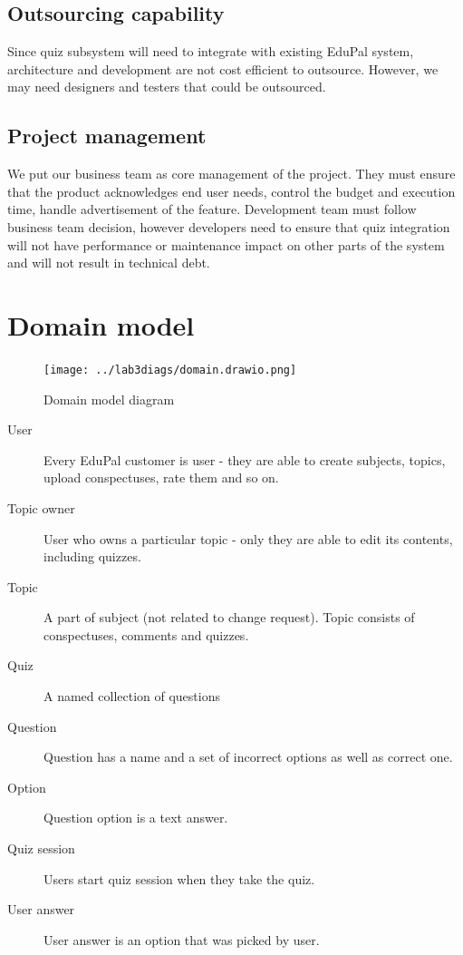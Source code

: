 \documentclass[
    english, %
]{VUMIFPSkursinis}
\begin{document}
\subsection{Outsourcing capability}

Since quiz subsystem will need to integrate with existing EduPal system, architecture and development are not cost efficient to outsource. However, we may need designers and testers that could be outsourced.

\subsection{Project management}

We put our business team as core management of the project. They must ensure that the product acknowledges end user needs, control the budget and execution time, handle advertisement of the feature. Development team must follow business team decision, however developers need to ensure that quiz integration will not have performance or maintenance impact on other parts of the system and will not result in technical debt.

\section{Domain model}

\begin{figure}[ht]
    \centering
    \texttt{[image: ../lab3diags/domain.drawio.png]}
    \caption{Domain model diagram}
    \label{domain-model}
\end{figure}

\begin{description}
    \item[User] Every EduPal customer is user - they are able to create subjects, topics, upload conspectuses, rate them and so on.
    \item[Topic owner] User who owns a particular topic - only they are able to edit its contents, including quizzes.
    \item[Topic] A part of subject (not related to change request). Topic consists of conspectuses, comments and quizzes.
    \item[Quiz] A named collection of questions
    \item[Question] Question has a name and a set of incorrect options as well as correct one.
    \item[Option] Question option is a text answer.
    \item[Quiz session] Users start quiz session when they take the quiz.
    \item[User answer] User answer is an option that was picked by user.
\end{description}
\end{document}
